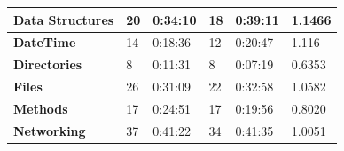 \documentclass[12pt]{article}
\begin{document}
\begin{table}[ht]
{\begin{tabular}{|l|l|l|l|l|l|}
\textbf{Data Structures} & 20                                                                       & 0:34:10                                                                        & 18                                                                                        & 0:39:11                                                                         & 1.1466                                                                           \\ \hline
\textbf{DateTime}        & 14                                                                       & 0:18:36                                                                        & 12                                                                                        & 0:20:47                                                                         & 1.116                                                                            \\ \hline
\textbf{Directories}     & 8                                                                        & 0:11:31                                                                        & 8                                                                                         & 0:07:19                                                                         & 0.6353                                                                           \\ \hline
\textbf{Files}           & 26                                                                       & 0:31:09                                                                        & 22                                                                                        & 0:32:58                                                                         & 1.0582                                                                           \\ \hline
\textbf{Methods}         & 17                                                                       & 0:24:51                                                                        & 17                                                                                        & 0:19:56                                                                         & 0.8020                                                                           \\ \hline
\textbf{Networking}      & 37                                                                       & 0:41:22                                                                        & 34                                                                                        & 0:41:35                                                                         & 1.0051                                                                           \\ \hline

\end{tabular}}
\end{table}
\end{document}
